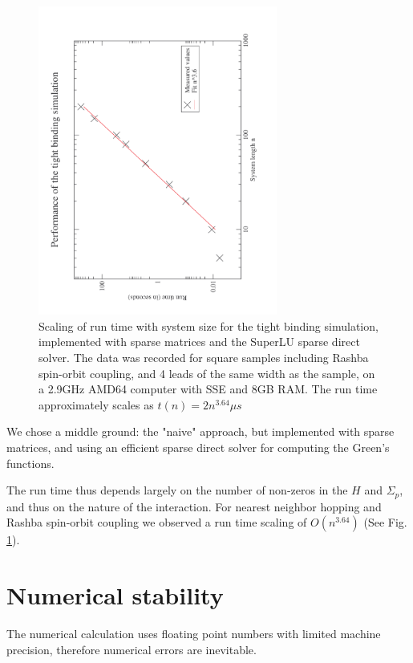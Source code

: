 \begin{figure}
    \includegraphics[angle=270,width=0.7\textwidth]{scaling.pdf}
    \caption{Scaling of run time with system size for the tight binding
        simulation, implemented with sparse matrices and the SuperLU sparse
        direct solver. The data was recorded for square samples including
        Rashba spin-orbit coupling, and 4 leads of the same width as the
        sample, on a 2.9GHz AMD64 computer with SSE and 8GB RAM.
        The run time approximately scales as $t(n) = 2
        n^{3.64}\mu s$}
        \label{fig:scaling}
\end{figure}

We chose a middle ground: the "naive" approach, but implemented with sparse
matrices, and using an efficient sparse direct solver\cite{superlu99} for
computing the Green's functions.

The run time thus depends largely on the number of non-zeros in the $H$ and
$\Sigma_p$, and thus on the nature of the interaction. For nearest neighbor
hopping and Rashba spin-orbit coupling we observed a run time scaling of
$O(n^{3.64})$ (See Fig. \ref{fig:scaling}).

\section*{Numerical stability}

The numerical
calculation uses floating point numbers with limited machine precision,
therefore numerical errors are inevitable.

